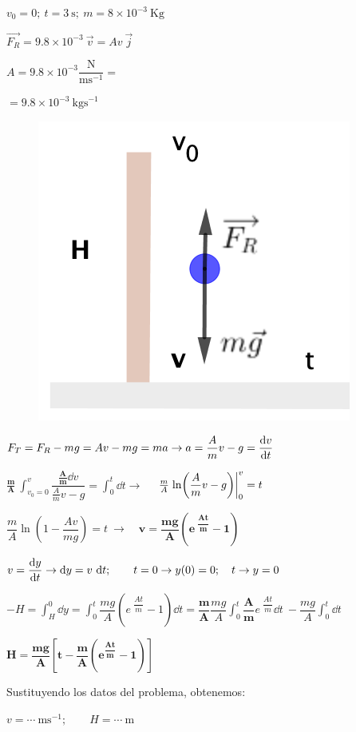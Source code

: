 \begin{multicols}{2}
$v_0=0;\ t=3 \ \mathrm{s};\ m=8\times 10^{-3}\ \textrm{Kg}$

$\overrightarrow{F_R}=9.8\times 10^{-3}\ \vec v=Av\ \vec j$

$ A=9.8\times 10^{-3} \dfrac{\mathrm{N}}{\mathrm{ms}^{-1}}=$

$=9.8\times 10^{-3}\ \mathrm{kgs}^{-1}$
\begin{figure}[H]
	\centering
	\includegraphics[width=.25\textwidth]{imagenes/imagenes09/T09IM11.png}
\end{figure}		
\end{multicols}
$F_T=F_R-mg=Av-mg=ma \to a=\dfrac Am v - g =\displaystyle \dv{v}{t}$

$\boldsymbol{\frac m A} \displaystyle  \ \int_{v_0=0}^{v} {\dfrac{\boldsymbol{\frac A m} \dd v}{\frac A m v - g}}=\int_0^t \dd t \to $ 
$\quad \frac m A  \displaystyle \eval{ \ln(\frac A m v - g) }_0^v=t$

$\dfrac m A \ln \left( 1-\dfrac{Av}{mg} \right)=t \ \to \quad \boxed{\boldsymbol{v=\dfrac{mg}{A} \left( e\ ^{\dfrac {At}{m} }-1 \right)}}$

$v=\displaystyle \dv{y}{t} \to \dd y= v\ \dd t; \qquad t=0 \to y(0)=0;\quad t\to y=0$

$-H=\displaystyle \int_{H}^0 \dd y = \int_0^t \dfrac{mg}{A} \left( e\ ^{\dfrac {At}{m} }-1 \right) \dd t =
   \boldsymbol{\dfrac m A} \dfrac{mg}{A}  \int_0^t  \boldsymbol{\dfrac A m} e\ ^{\dfrac {At}{m} } \dd t  \ -
   \dfrac{mg}{A} \int_0^t  \dd t 
$

$\boxed{ \boldsymbol{ H= \dfrac{mg}{A} \left[ t - \dfrac m A \left( e^{\dfrac{At}{m}}-1 \right) \right] } }$

Sustituyendo los datos del problema, obtenemos: 

$v= \cdots \ \mathrm{ms}^{-1}; \qquad H= \cdots \ \mathrm{m}$




\newpage %

